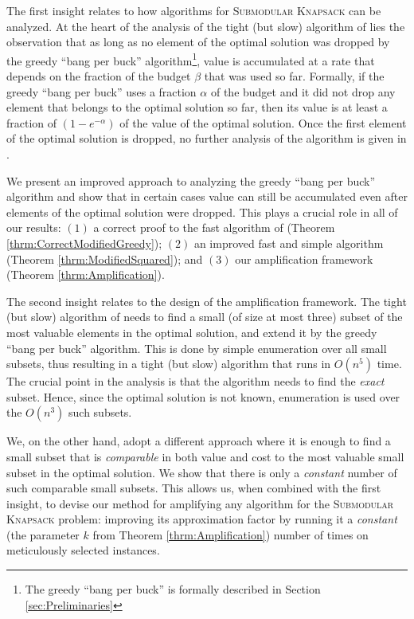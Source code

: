 \documentclass[a4paper,UKenglish,cleveref, autoref]{lipics-v2019}
\newcommand{\SK}{{\textsc{Submodular Knapsack}}\xspace}
\begin{document}
The first insight relates to how algorithms for \SK can be analyzed.
At the heart of the analysis of the tight (but slow) algorithm of \cite{khuller1999budgeted,sviridenko2004note} lies the observation that as long as no element of the optimal solution was dropped by the greedy ``bang per buck'' algorithm\footnote{The greedy ``bang per buck'' is formally described in Section \ref{sec:Preliminaries}}, value is accumulated at a rate that depends on the fraction of the budget $\beta$ that was used so far.
Formally, if the greedy ``bang per buck'' uses a fraction $\alpha$ of the budget and it did not drop any element that belongs to the optimal solution so far, then its value is at least a fraction of $(1-e^{-\alpha})$ of the value of the optimal solution.
Once the first element of the optimal solution is dropped, no further analysis of the algorithm is given in \cite{khuller1999budgeted,sviridenko2004note}.

We present an improved approach to analyzing the greedy ``bang per buck'' algorithm and show that in certain cases value can still be accumulated even after elements of the optimal solution were dropped.
This plays a crucial role in all of our results: $(1)$ a correct proof to the fast algorithm of \cite{khuller1999budgeted} (Theorem \ref{thrm:CorrectModifiedGreedy}); $(2)$ an improved fast and simple algorithm (Theorem \ref{thrm:ModifiedSquared}); and $(3)$ our amplification framework (Theorem \ref{thrm:Amplification}).

The second insight relates to the design of the amplification framework.
The tight (but slow) algorithm of \cite{khuller1999budgeted,sviridenko2004note} needs to find a small (of size at most three) subset of the most valuable elements in the optimal solution, and extend it by the greedy ``bang per buck'' algorithm.
This is done by simple enumeration over all small subsets, thus resulting in a tight (but slow) algorithm that runs in $ O(n^5)$ time.
The crucial point in the analysis is that the algorithm needs to find the {\em exact} subset.
Hence, since the optimal solution is not known, enumeration is used over the $O(n^3)$ such subsets.

We, on the other hand, adopt a different approach where it is enough to find a small subset that is {\em comparable} in both value and cost to the most valuable small subset in the optimal solution.
We show that there is only a {\em constant} number of such comparable small subsets.
This allows us, when combined with the first insight, to devise our method for amplifying any algorithm for the \SK problem: improving its approximation factor
by running it a {\em constant} (the parameter $k$ from Theorem \ref{thrm:Amplification}) number of times on meticulously selected instances.
\end{document}
